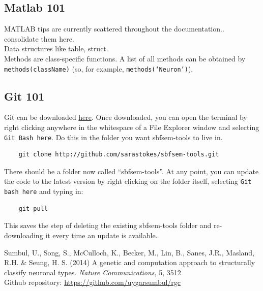 \documentclass[12pt]{exam}
\begin{document}
	\subsection{Matlab 101}
	MATLAB tips are currently scattered throughout the documentation.. consolidate them here.\\
	Data structures like table, struct.\\
	Methods are class-specific functions. A list of all methods can be obtained by \texttt{methods(className)} (so, for example, \texttt{methods(`Neuron')}).
	\subsection{Git 101}
	Git can be downloaded \href{https://git-scm.com/}{here}. Once downloaded, you can open the terminal by right clicking anywhere in the whitespace of a File Explorer window and selecting \texttt{Git Bash here}. Do this in the folder you want sbfsem-tools to live in. 
	\begin{lstlisting}
	git clone http://github.com/sarastokes/sbfsem-tools.git\end{lstlisting}
	There should be a folder now called ``sbfsem-tools''. At any point, you can update the code to the latest version by right clicking on the folder itself, selecting \texttt{Git bash here} and typing in:
	\begin{lstlisting}
	git pull\end{lstlisting}
	This saves the step of deleting the existing sbfsem-tools folder and re-downloading it every time an update is available.
	\begin{thebibliography}{[20]}
		Sumbul, U., Song, S., McCulloch, K., Becker, M., Lin, B., Sanes, J.R., Masland, R.H. \& Seung, H. S. (2014) A genetic and computation approach to structurally classify neuronal types. \textit{Nature Communications}, 5, 3512\\
		Github repository: \url{https://github.com/uygarsumbul/rgc}
	\end{thebibliography}
\end{document}
